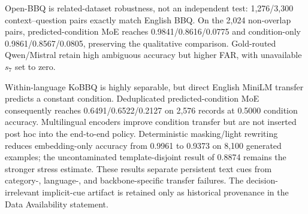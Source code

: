 \documentclass{ieeeaccess}
\begin{document}
Open-BBQ is related-dataset robustness, not an independent test: 1,276/3,300 context--question pairs exactly match English BBQ. On the 2,024 non-overlap pairs, predicted-condition MoE reaches 0.9841/0.8616/0.0775 and condition-only 0.9861/0.8567/0.0805, preserving the qualitative comparison. Gold-routed Qwen/Mistral retain high ambiguous accuracy but higher FAR, with unavailable $s_7$ set to zero.

Within-language KoBBQ is highly separable, but direct English MiniLM transfer predicts a constant condition. Deduplicated predicted-condition MoE consequently reaches 0.6491/0.6522/0.2127 on 2,576 records at 0.5000 condition accuracy. Multilingual encoders improve condition transfer but are not inserted post hoc into the end-to-end policy. Deterministic masking/light rewriting reduces embedding-only accuracy from 0.9961 to 0.9373 on 8,100 generated examples; the uncontaminated template-disjoint result of 0.8874 remains the stronger stress estimate. These results separate persistent text cues from category-, language-, and backbone-specific transfer failures. The decision-irrelevant implicit-cue artifact is retained only as historical provenance in the Data Availability statement.
\end{document}
